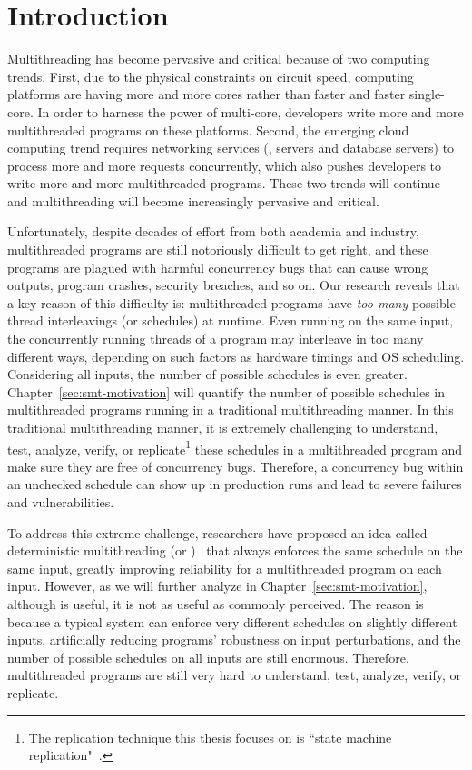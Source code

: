\chapter{Introduction} \label{sec:intro}

Multithreading has become pervasive and critical because of two computing
trends. First, due to the physical constraints on circuit speed, computing
platforms are having more and more cores rather than faster and faster
single-core. In order to harness the power of multi-core, developers write more
and more multithreaded programs on these platforms. Second, the emerging cloud
computing trend requires networking services (\eg, \http servers and database
servers) to process more and more requests concurrently, which also pushes
developers to write more and more multithreaded programs. These two trends will
continue and multithreading will become increasingly pervasive and critical.

Unfortunately, despite decades of effort from both academia and industry,
multithreaded programs are still notoriously difficult to get right, and these
programs are plagued with harmful concurrency bugs that can cause wrong outputs,
program crashes, security breaches, and so on. Our research reveals that a key
reason of this difficulty is: multithreaded programs have \emph{too many}
possible thread interleavings (or schedules) at runtime. Even running on the
same input, the concurrently running threads of a program may interleave in too
many different ways, depending on such factors as hardware timings and OS
scheduling. Considering all inputs, the number of possible schedules is even
greater. Chapter~\ref{sec:smt-motivation} will quantify the number of
possible schedules in multithreaded programs running in a traditional
multithreading manner. In this traditional multithreading manner, it is
extremely challenging to understand, test, analyze, verify, or
replicate\footnote{ The replication technique this thesis focuses on is
``state machine replication"~\cite{paxos:practical}. } these schedules in a
multithreaded program and make sure they are free of concurrency bugs.
Therefore, a concurrency bug within an unchecked schedule can show up in
production runs and lead to severe failures and vulnerabilities.

To address this extreme challenge, researchers have proposed an idea called
deterministic multithreading (or \dmt)~\cite{dthreads:sosp11, dpj:oopsla09,
dmp:asplos09, kendo:asplos09, coredet:asplos10} that always enforces the same
schedule on the same input, greatly improving reliability for a multithreaded
program on each input. However, as we will further analyze in
Chapter~\ref{sec:smt-motivation}, although \dmt is useful, it is not as useful
as commonly perceived. The reason is because a typical \dmt system can enforce
very different schedules on slightly different inputs, artificially reducing
programs' robustness on input perturbations, and the number of possible
schedules on all inputs are still enormous. Therefore, multithreaded programs
are still very hard to understand, test, analyze, verify, or replicate.

